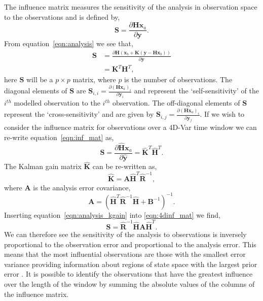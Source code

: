 \documentclass[11pt]{article}
\begin{document}
The influence matrix measures the sensitivity of the analysis in observation space to the observations \citep{Cardinali2004} and is defined by,
\begin{equation}
\textbf{S} = \frac{\partial \textbf{H}\textbf{x}_{a}}{\partial \textbf{y}}. \label{eqn:inf_mat}
\end{equation}
From equation~\eqref{eqn:analysis} we see that,
\begin{equation}
\begin{split}
\textbf{S} &= \frac{\partial \textbf{H}(\textbf{x}_{b} + \textbf{K}(\textbf{y} - \textbf{H}\textbf{x}_{b}))}{\partial \textbf{y}} \\
	       &= \textbf{K}^{T}\textbf{H}^{T},
\end{split}
\end{equation}
here $\textbf{S}$ will be a $p \times p$ matrix, where $p$ is the number of observations. The diagonal elements of $\textbf{S}$ are $\textbf{S}_{i,i} = \frac{\partial (\textbf{H}\textbf{x}_{a})_{i}}{\partial \textbf{y}_{i}}$ and represent the `self-sensitivity' of the $i^{th}$ modelled observation to the $i^{th}$ observation. The off-diagonal elements of $\textbf{S}$ represent the `cross-sensitivity' and are given by $\textbf{S}_{i,j} = \frac{\partial (\textbf{H}\textbf{x}_{a})_{i}}{\partial \textbf{y}_{j}}$. If we wish to consider the influence matrix for observations over a 4D-Var time window we can re-write equation~\eqref{eqn:inf_mat} as,
\begin{equation}
\textbf{S} = \frac{\partial \hat{\textbf{H}}\textbf{x}_{a}}{\partial \hat{\textbf{y}}} = \hat{\textbf{K}}^{T}\hat{\textbf{H}}^{T}. \label{eqn:4dinf_mat}
\end{equation}
The Kalman gain matrix $\hat{\textbf{K}}$ can be re-written as,
\begin{equation}
\hat{\textbf{K}} = \textbf{A}\hat{\textbf{H}}^{T}\hat{\textbf{R}}^{-1}, \label{eqn:analysis_kgain}
\end{equation}
where $\textbf{A}$ is the analysis error covariance,
\begin{equation}
\textbf{A} = (\hat{\textbf{H}}^{T}\hat{\textbf{R}}^{-1}\hat{\textbf{H}} + \textbf{B}^{-1})^{-1}.
\end{equation}
Inserting equation~\eqref{eqn:analysis_kgain} into \eqref{eqn:4dinf_mat} we find,
 \begin{equation}
 \textbf{S} = \hat{\textbf{R}}^{-1}\hat{\textbf{H}}\textbf{A}\hat{\textbf{H}}^{T}.
 \end{equation}
We can therefore see the sensitivity of the analysis to observations is inversely proportional to the observation error and proportional to the analysis error. This means that the most influential observations are those with the smallest error variance providing information about regions of state space with the largest prior error \citep{Cardinali2004}. It is possible to identify the observations that have the greatest influence over the length of the window by summing the absolute values of the columns of the influence matrix.
\end{document}
